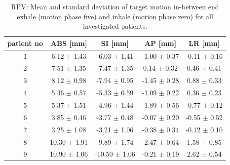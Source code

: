 \documentclass[type=dr, dr=rernat, accentcolor=tud7b,colorbacktitle, bigchapter, openright, twoside, 12pt ]{tudthesis}
\begin{document}
\begin{table}[htbp]
  \centering
  \caption{RPV: Mean and standard deviation of target motion in-between end exhale (motion phase five) and inhale (motion phase zero) for all 
  investigated patients.}
  \begin{tabular}{|c|c|c|c|c|}
    \hline\hline
    patient no\rule{0pt}{2.6ex}\rule[-1.2ex]{0pt}{0pt} & ABS [mm] & SI [mm] & AP [mm] & LR [mm]\\
    \hline
    1 & 6.12 $\pm$ 1.43 & -6.03 $\pm$ 1.41 & -1.00 $\pm$ 0.37 & -0.11 $\pm$ 0.16 \\
    2 & 7.51 $\pm$ 1.35 & -7.47 $\pm$ 1.35 & 0.14 $\pm$ 0.32 & 0.46 $\pm$ 0.41 \\
    3 & 8.12 $\pm$ 0.98 & -7.94 $\pm$ 0.95 & -1.45 $\pm$ 0.28 & 0.88 $\pm$ 0.33 \\
    4 & 5.46 $\pm$ 0.57 & -5.33 $\pm$ 0.59 & -1.09 $\pm$ 0.22 & 0.36 $\pm$ 0.23 \\
    5 & 5.37 $\pm$ 1.51 & -4.96 $\pm$ 1.44 & -1.89 $\pm$ 0.56 & -0.77 $\pm$ 0.12 \\
    6 & 3.85 $\pm$ 0.46 & -3.77 $\pm$ 0.48 & -0.07 $\pm$ 0.20 & -0.55 $\pm$ 0.52 \\
    7 & 3.25 $\pm$ 1.08 & -3.21 $\pm$ 1.06 & -0.38 $\pm$ 0.34 & -0.12 $\pm$ 0.10 \\
    8 & 10.30 $\pm$ 1.91 & -9.89 $\pm$ 1.74 & -2.47 $\pm$ 0.64 & 1.58 $\pm$ 0.85 \\
    9 & 10.90 $\pm$ 1.06 & -10.50 $\pm$ 1.06 & -0.21 $\pm$ 0.19 & 2.62 $\pm$ 0.54 \\
    \hline\hline
  \end{tabular}
  \label{tab:motion:RPV}
\end{table}


\end{document}
